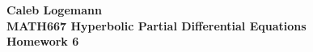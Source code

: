 \documentclass[11pt, oneside]{article}
\begin{document}
\noindent \textbf{\Large{Caleb Logemann \\
MATH667 Hyperbolic Partial Differential Equations \\
Homework 6
}}

%
\begin{enumerate}
\end{enumerate}
\end{document}
